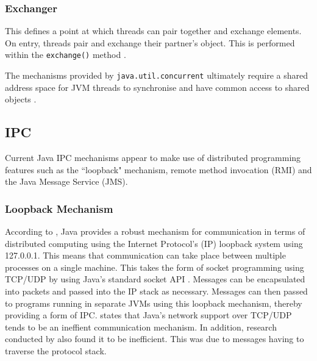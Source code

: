 \documentclass[12pt,a4paper,oneside]{article}
\def\code#1{\texttt{#1}}
\begin{document}
    \subsubsection{Exchanger}
      This defines a point at which threads can pair together and exchange elements. On entry, threads pair and exchange their partner's object. This is performed within the \code{exchange()} method \citep{JavaAPI}.

  The mechanisms provided by \code{java.util.concurrent} ultimately require a shared address space for JVM threads to synchronise and have common access to shared objects \citep{WellsIPCMultiProc}.

  \subsection{IPC}
    Current Java IPC mechanisms appear to make use of distributed programming features such as the ``loopback" mechanism, remote method invocation (RMI) and the Java Message Service (JMS).

  \subsubsection{Loopback Mechanism}
    According to \cite{WellsIPCJava}, Java provides a robust mechanism for communication in terms of distributed computing using the Internet Protocol's (IP) loopback system using 127.0.0.1. This means that communication can take place between multiple processes on a single machine. This takes the form of socket programming using TCP/UDP by using Java's standard socket API \citep{taboada2013javaforHPC}. Messages can be encapsulated into packets and passed into the IP stack as necessary. Messages can then passed to programs running in separate JVMs using this loopback mechanism, thereby providing a form of IPC. \cite{taboada2013javaforHPC} states that Java's network support over TCP/UDP tends to be an ineffient communication mechanism. In addition, research conducted by \cite{WellsIPCMultiProc} also found it to be inefficient. This was due to messages having to traverse the protocol stack.
\end{document}
